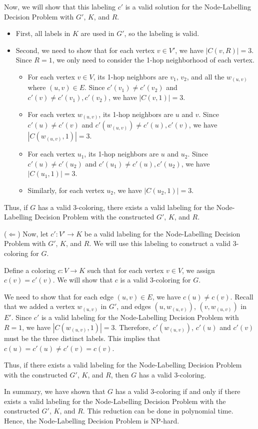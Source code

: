 \documentclass{article}
\begin{document}
\begin{enumerate}
    Now, we will show that this labeling $c'$ is a valid solution for the Node-Labelling Decision Problem with $G'$, $K$, and $R$.
    \begin{itemize}
        \item First, all labels in $K$ are used in $G'$, so the labeling is valid.
        \item Second, we need to show that for each vertex $v \in V'$, we have $|C(v, R)| = 3$. Since $R = 1$, we only need to consider the 1-hop neighborhood of each vertex.
        \begin{itemize}
            \item For each vertex $v \in V$, its 1-hop neighbors are $v_1$, $v_2$, and all the $w_{(u, v)}$ where $(u, v) \in E$. Since $c'(v_1) \neq c'(v_2)$ and $c'(v) \neq c'(v_1), c'(v_2)$, we have $|C(v, 1)| = 3$.
            \item For each vertex $w_{(u, v)}$, its 1-hop neighbors are $u$ and $v$. Since $c'(u) \neq c'(v)$ and $c'(w_{(u, v)}) \neq c'(u), c'(v)$, we have $|C(w_{(u, v)}, 1)| = 3$.
            \item For each vertex $u_1$, its 1-hop neighbors are $u$ and $u_2$. Since $c'(u) \neq c'(u_2)$ and $c'(u_1) \neq c'(u), c'(u_2)$, we have $|C(u_1, 1)| = 3$.
            \item Similarly, for each vertex $u_2$, we have $|C(u_2, 1)| = 3$.
        \end{itemize}
    \end{itemize}

    Thus, if $G$ has a valid 3-coloring, there exists a valid labeling for the Node-Labelling Decision Problem with the constructed $G'$, $K$, and $R$.
    
    ($\Leftarrow$) Now, let $c': V' \rightarrow K$ be a valid labeling for the Node-Labelling Decision Problem with $G'$, $K$, and $R$. We will use this labeling to construct a valid 3-coloring for $G$.

    Define a coloring $c: V \rightarrow K$ such that for each vertex $v \in V$, we assign $c(v) = c'(v)$. We will show that $c$ is a valid 3-coloring for $G$.
    
    We need to show that for each edge $(u, v) \in E$, we have $c(u) \neq c(v)$. Recall that we added a vertex $w_{(u, v)}$ in $G'$, and edges $(u, w_{(u, v)})$, $(v, w_{(u, v)})$ in $E'$. Since $c'$ is a valid labeling for the Node-Labelling Decision Problem with $R = 1$, we have $|C(w_{(u,v)}, 1)| = 3$. Therefore, $c'(w_{(u, v)})$, $c'(u)$ and $c'(v)$ must be the three distinct labels. This implies that $c(u) = c'(u) \neq c'(v) = c(v)$.

    Thus, if there exists a valid labeling for the Node-Labelling Decision Problem with the constructed $G'$, $K$, and $R$, then $G$ has a valid 3-coloring.

    In summary, we have shown that $G$ has a valid 3-coloring if and only if there exists a valid labeling for the Node-Labelling Decision Problem with the constructed $G'$, $K$, and $R$. This reduction can be done in polynomial time. Hence, the Node-Labelling Decision Problem is NP-hard.
\end{enumerate}
\end{document}
